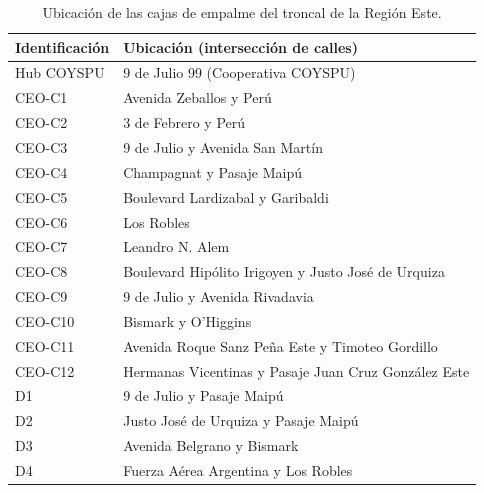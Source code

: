 \begin{table}[H]\centering\footnotesize
\caption{Ubicación de las cajas de empalme del troncal de la Región Este.}\label{tab:nodos}
\begin{tabular}{|l|l|}\hline \textbf{Identificación} & \textbf{Ubicación (intersección de calles)} \\ \hline
Hub COYSPU & 9 de Julio 99 (Cooperativa COYSPU) \\ \hline
CEO-C1 & Avenida Zeballos y Perú \\ \hline
CEO-C2 & 3 de Febrero y Perú \\ \hline
CEO-C3 & 9 de Julio y Avenida San Martín \\ \hline
CEO-C4 & Champagnat y Pasaje Maipú \\ \hline
CEO-C5 & Boulevard Lardizabal y Garibaldi \\ \hline
CEO-C6 & Los Robles \\ \hline
CEO-C7 & Leandro N. Alem \\ \hline
CEO-C8 & Boulevard Hipólito Irigoyen y Justo José de Urquiza \\ \hline
CEO-C9 & 9 de Julio y Avenida Rivadavia \\ \hline
CEO-C10 & Bismark y O'Higgins \\ \hline
CEO-C11 & Avenida Roque Sanz Peña Este y Timoteo Gordillo \\ \hline
CEO-C12 & Hermanas Vicentinas y Pasaje Juan Cruz González Este \\ \hline
D1 & 9 de Julio y Pasaje Maipú \\ \hline
D2 & Justo José de Urquiza y Pasaje Maipú \\ \hline
D3 & Avenida Belgrano y Bismark \\ \hline
D4 & Fuerza Aérea Argentina y Los Robles \\ \hline
\end{tabular}\end{table}
